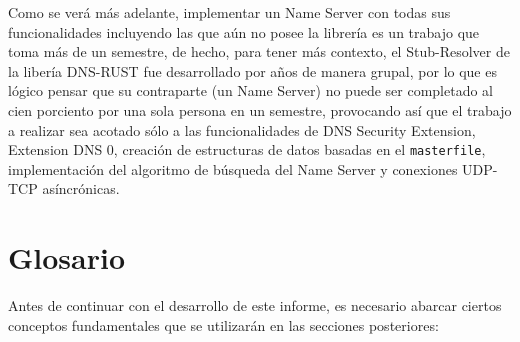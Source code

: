 Como se verá más adelante, implementar un Name Server con todas sus funcionalidades incluyendo las que aún no posee la librería es un trabajo 
que toma más de un semestre, de hecho, para tener más contexto, el Stub-Resolver de la libería DNS-RUST fue desarrollado por años de manera 
grupal, por lo que es lógico pensar que su contraparte (un Name Server) no puede ser completado al cien porciento por una sola persona en un 
semestre, provocando así que el trabajo a realizar sea acotado sólo a las funcionalidades de DNS Security Extension, Extension DNS 0, 
creación de estructuras de datos basadas en el \texttt{masterfile}, implementación del algoritmo de búsqueda del Name Server y conexiones UDP-TCP 
asíncrónicas.



\section{Glosario}
Antes de continuar con el desarrollo de este informe, es necesario abarcar ciertos conceptos fundamentales que se utilizarán en las secciones posteriores:

